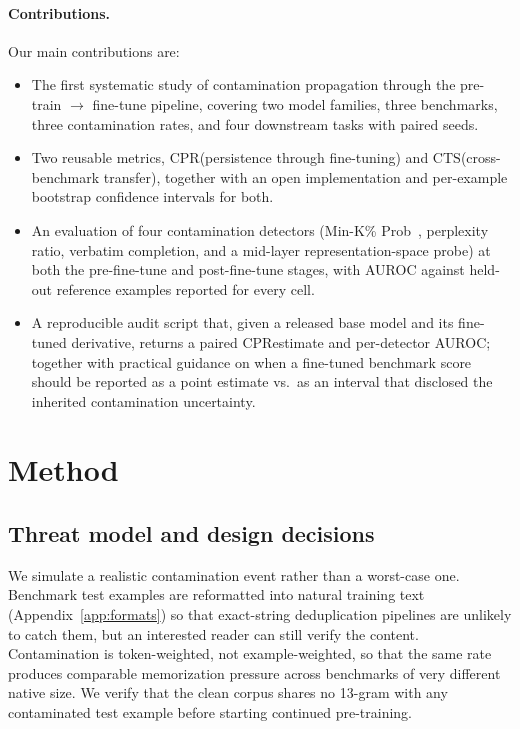 \documentclass{article}
\newcommand{\cpr}{\ensuremath{\mathrm{CPR}}}
\newcommand{\cts}{\ensuremath{\mathrm{CTS}}}
\begin{document}
\paragraph{Contributions.} Our main contributions are:
\begin{itemize}[leftmargin=*,nosep]
  \item The first systematic study of contamination propagation through the pre-train $\to$ fine-tune pipeline, covering two model families, three benchmarks, three contamination rates, and four downstream tasks with paired seeds.
  \item Two reusable metrics, \cpr (persistence through fine-tuning) and \cts (cross-benchmark transfer), together with an open implementation and per-example bootstrap confidence intervals for both.
  \item An evaluation of four contamination detectors (Min-K\% Prob~\citep{shi2024detecting}, perplexity ratio, verbatim completion, and a mid-layer representation-space probe) at both the pre-fine-tune and post-fine-tune stages, with AUROC against held-out reference examples reported for every cell.
  \item A reproducible audit script that, given a released base model and its fine-tuned derivative, returns a paired \cpr estimate and per-detector AUROC; together with practical guidance on when a fine-tuned benchmark score should be reported as a point estimate vs.\ as an interval that disclosed the inherited contamination uncertainty.
\end{itemize}



\section{Method}
\label{sec:method}

\subsection{Threat model and design decisions}
We simulate a realistic contamination event rather than a worst-case one. Benchmark test examples are reformatted into natural training text (Appendix~\ref{app:formats}) so that exact-string deduplication pipelines are unlikely to catch them, but an interested reader can still verify the content. Contamination is token-weighted, not example-weighted, so that the same rate produces comparable memorization pressure across benchmarks of very different native size. We verify that the clean corpus shares no 13-gram with any contaminated test example before starting continued pre-training.
\end{document}
